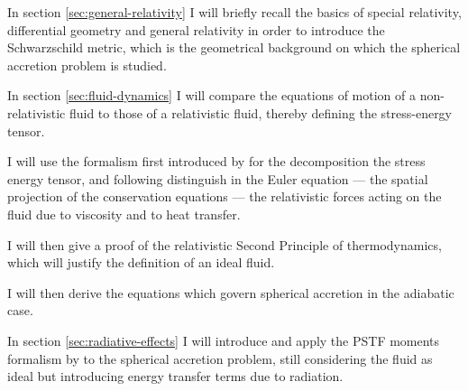 \documentclass[main.tex]{subfiles}
\begin{document}
In section \ref{sec:general-relativity} I will briefly recall the basics of special relativity, differential geometry and general relativity in order to introduce the Schwarzschild metric, which is the geometrical background on which the spherical accretion problem is studied.

In section \ref{sec:fluid-dynamics} I will compare the equations of motion of a non-relativistic fluid to those of a relativistic fluid, thereby defining the stress-energy tensor.

I will use the formalism first introduced by \textcite[]{Eckart:1940} for the decomposition the stress energy tensor, and following \textcite[]{Taub:1978} distinguish in the Euler equation --- the spatial projection of the conservation equations --- the relativistic forces acting on the fluid due to viscosity and to heat transfer.

I will then give a proof of the relativistic Second Principle of thermodynamics, which will justify the definition of an ideal fluid.

I will then derive the equations which govern spherical accretion in the adiabatic case.

In section \ref{sec:radiative-effects} I will introduce and apply the PSTF moments formalism by \textcite[]{Thorne:1981feb} to the spherical accretion problem, still considering the fluid as ideal but introducing energy transfer terms due to radiation.
\end{document}

